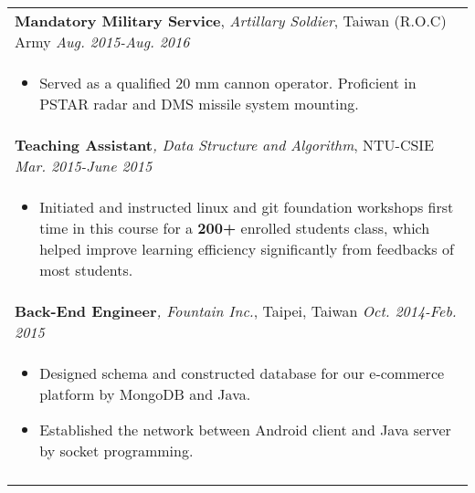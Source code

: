 \documentclass[a4paper,10pt]{article} %
\begin{document}
\begin{tabular}{p{17cm}}
	\normalsize\textbf{Mandatory Military Service}, {\it{Artillary Soldier}}, Taiwan (R.O.C) Army  \hfill \it Aug. 2015-Aug. 2016 \\%
\begin{itemize}
\vspace{-2mm}
\item Served as a qualified 20 mm cannon operator. Proficient in PSTAR radar and DMS missile system mounting.\vspace*{-\baselineskip}
\end{itemize} \\ 
\vspace{0.5mm}

\normalsize\textbf{Teaching Assistant}{\it, Data Structure and Algorithm}, NTU-CSIE  \hfill  \it{Mar. 2015-June 2015} \\%
\begin{itemize}
\vspace{-2mm}
\item Initiated and instructed linux and git foundation workshops first time in this course for a \textbf{200+} enrolled students class, which helped improve learning efficiency significantly from feedbacks of most students.\vspace*{-\baselineskip}
\end{itemize} \\ 
\vspace{0.5mm}

\normalsize\textbf{Back-End Engineer}{\it, Fountain Inc.}, Taipei, Taiwan \hfill  \it{Oct. 2014-Feb. 2015}  \\%
\begin{itemize}
\vspace{-2mm}
\item Designed schema and constructed database for our e-commerce platform by MongoDB and Java. 
\item Established the network between Android client and Java server by socket programming. \vspace*{-\baselineskip}
\end{itemize}\\
\vspace{0.5mm}


\end{tabular}
\end{document}
